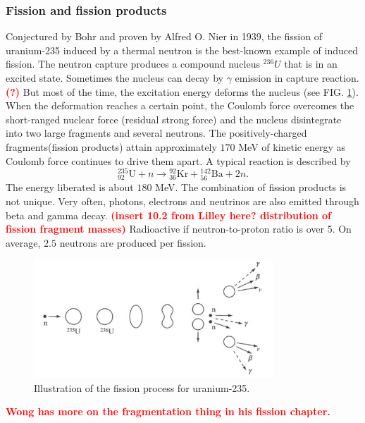 \documentclass[nofootinbib,preprint,aip,pra]{revtex4-1}
\newcommand{\red}[1]{\textcolor{red}{\bf #1}}
\begin{document}
        \subsubsection{Fission and fission products}
        Conjectured by Bohr and proven by Alfred O. Nier in 1939,
        the fission of uranium-235 induced by a thermal neutron
        is the best-known example of induced fission. 
        The neutron capture produces a compound nucleus ${}^{236}U$ that is in an excited state.
        Sometimes the nucleus can decay by $\gamma$ emission in capture reaction. \red{(?)}
        But most of the time, the excitation energy deforms the nucleus (see FIG. \ref{fig:fission}).
        When the
        deformation reaches a certain point, the Coulomb force overcomes the short-ranged nuclear
        force (residual strong force) and the nucleus disintegrate into two large fragments and several neutrons. The
        positively-charged fragments(fission products) attain approximately $170$ MeV of kinetic energy as
        Coulomb force continues to drive them apart.\cite{l01}
        A typical reaction is described by
        \[{}^{235}_{92}\text{U} + n \rightarrow {}^{92}_{36}\text{Kr} + {}^{142}_{56}\text{Ba} + 2 n.\]
        The energy liberated is about $180$ MeV. The combination of fission products is not
        unique. \cite{w98, gc01}
        Very often, photons, electrons and neutrinos are also emitted through beta and gamma decay.
        \red{(insert 10.2 from Lilley here? distribution of fission fragment masses)}
        Radioactive if neutron-to-proton ratio is over 5. On average, $2.5$ neutrons are produced per fission.\cite{l01} 
        \begin{figure}[h]
            \centering
            \includegraphics[width=0.8\textwidth]{fission.png}
            \caption{Illustration of the fission process for uranium-235.\cite{l01}}
            \label{fig:fission}
        \end{figure}

        \red{Wong has more on the fragmentation thing in his fission chapter.}
\end{document}
